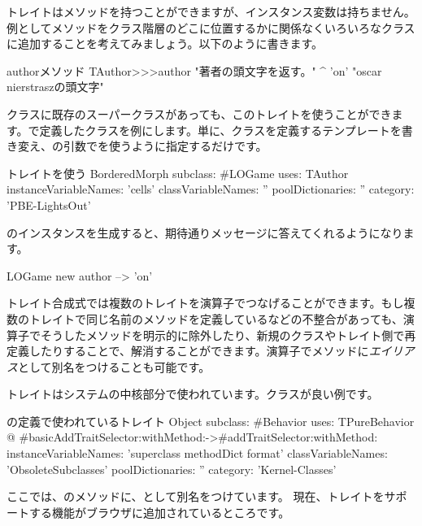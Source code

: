 \documentclass[a4paper,10pt,twoside]{book}
\begin{document}
トレイトはメソッドを持つことができますが、インスタンス変数は持ちません。例としてメソッドをクラス階層のどこに位置するかに関係なくいろいろなクラスに追加することを考えてみましょう。以下のように書きます。

\begin{method}[author]{authorメソッド}
TAuthor>>>author
    "著者の頭文字を返す。"
	^ 'on'    "oscar nierstraszの頭文字"
\end{method}

\noindent
クラスに既存のスーパークラスがあっても、このトレイトを使うことができます。で定義したクラスを例にします。単に、クラスを定義するテンプレートを書き変え、の引数でを使うように指定するだけです。

\begin{classdef}[sbegamewithtrait]{トレイトを使う}
BorderedMorph subclass: #LOGame
	uses: TAuthor
	instanceVariableNames: 'cells'
	classVariableNames: ''
	poolDictionaries: ''
	category: 'PBE-LightsOut'
\end{classdef}

のインスタンスを生成すると、期待通りメッセージに答えてくれるようになります。

\begin{code}{}
LOGame new author --> 'on'
\end{code}

トレイト合成式では複数のトレイトを\ct{+}演算子でつなげることができます。もし複数のトレイトで同じ名前のメソッドを定義しているなどの不整合があっても、\ct{-}演算子でそうしたメソッドを明示的に除外したり、新規のクラスやトレイト側で再定義したりすることで、解消することができます。演算子でメソッドに\emph{エイリアス}として別名をつけることも可能です。

トレイトはシステムの中核部分で使われています。\mbox{}クラスが良い例です。

\begin{classdef}[behaviorwithtraits]{の定義で使われているトレイト}
Object subclass: #Behavior
	uses: TPureBehavior @ {#basicAddTraitSelector:withMethod:->#addTraitSelector:withMethod:}
	instanceVariableNames: 'superclass methodDict format'
	classVariableNames: 'ObsoleteSubclasses'
	poolDictionaries: ''
	category: 'Kernel-Classes'
\end{classdef}
\noindent
ここでは、のメソッドに、として別名をつけています。
現在、トレイトをサポートする機能がブラウザに追加されているところです。
\end{document}
